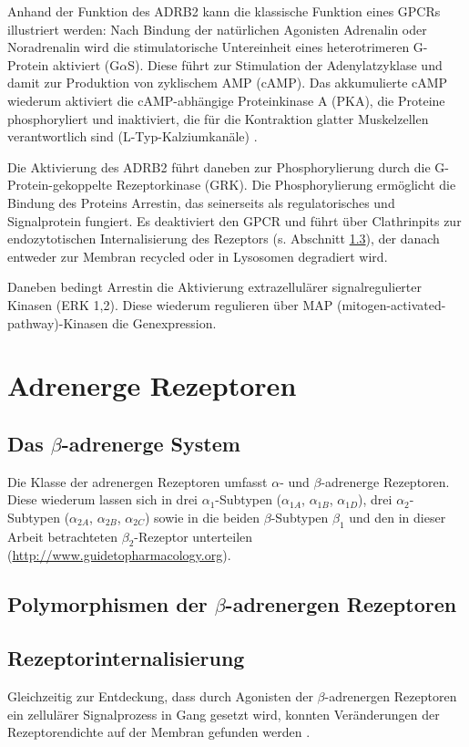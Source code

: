 Anhand der Funktion des ADRB2 kann die klassische Funktion eines GPCRs illustriert werden: Nach Bindung der natürlichen Agonisten Adrenalin oder Noradrenalin wird die stimulatorische Untereinheit eines heterotrimeren G-Protein aktiviert (G$\alpha$S). Diese führt zur Stimulation der Adenylatzyklase und damit zur Produktion von zyklischem AMP (cAMP). Das akkumulierte cAMP wiederum aktiviert die cAMP-abhängige Proteinkinase A (PKA), die Proteine phosphoryliert und inaktiviert, die für die Kontraktion glatter Muskelzellen verantwortlich sind (L-Typ-Kalziumkanäle) \parencite{Hoffman1982}. 

Die Aktivierung des ADRB2 führt daneben zur Phosphorylierung durch die G-Protein-gekoppelte Rezeptorkinase (GRK). Die Phosphorylierung ermöglicht die Bindung des Proteins Arrestin, das seinerseits als regulatorisches und Signalprotein fungiert. Es deaktiviert den GPCR und führt über Clathrinpits zur endozytotischen Internalisierung des Rezeptors (s. Abschnitt \ref{internalization}), der danach entweder zur Membran recycled oder in Lysosomen degradiert wird. 

Daneben bedingt Arrestin die Aktivierung extrazellulärer signalregulierter Kinasen (ERK 1,2). Diese wiederum regulieren über MAP (mitogen-activated-pathway)-Kinasen die Genexpression.

\section{Adrenerge Rezeptoren}
\subsection{Das $\beta$-adrenerge System}
Die Klasse der adrenergen Rezeptoren umfasst $\alpha$- und $\beta$-adrenerge Rezeptoren. Diese wiederum lassen sich in drei $\alpha_1$-Subtypen ($\alpha_{1A}$, $\alpha_{1B}$, $\alpha_{1D}$), drei $\alpha_2$-Subtypen ($\alpha_{2A}$, $\alpha_{2B}$, $\alpha_{2C}$) sowie in die beiden $\beta$-Subtypen $\beta_1$ und den in dieser Arbeit betrachteten $\beta_2$-Rezeptor unterteilen (\url{http://www.guidetopharmacology.org}).

\subsection{Polymorphismen der $\beta$-adrenergen Rezeptoren}
\subsection{Rezeptorinternalisierung}
\label{internalization}
Gleichzeitig zur Entdeckung, dass durch Agonisten der $\beta$-adrenergen Rezeptoren ein zellulärer  Signalprozess in Gang gesetzt wird, konnten Veränderungen der Rezeptorendichte auf der Membran gefunden werden \parencite{Chuang1979}. 

